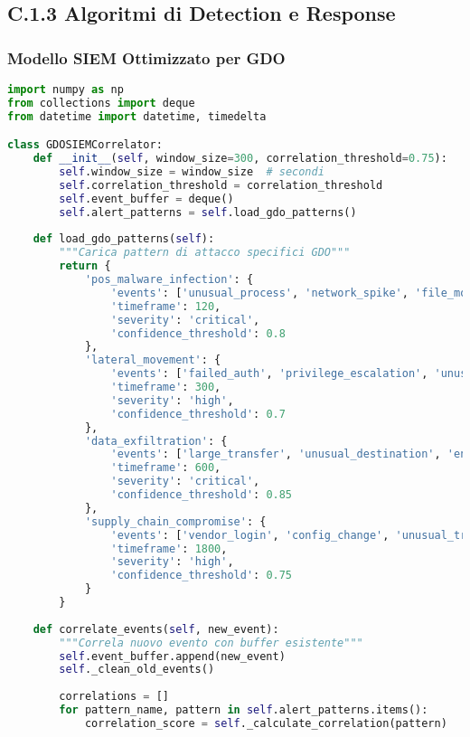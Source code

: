\subsection{\texorpdfstring{\textbf{C.1.3 Algoritmi di Detection e Response}}{C.1.3 - Algoritmi di Detection e Response}}

\subsubsection{Modello SIEM Ottimizzato per GDO}

\begin{lstlisting}[language=Python, caption=Algoritmo di Correlazione Eventi SIEM]
import numpy as np
from collections import deque
from datetime import datetime, timedelta

class GDOSIEMCorrelator:
    def __init__(self, window_size=300, correlation_threshold=0.75):
        self.window_size = window_size  # secondi
        self.correlation_threshold = correlation_threshold
        self.event_buffer = deque()
        self.alert_patterns = self.load_gdo_patterns()
        
    def load_gdo_patterns(self):
        """Carica pattern di attacco specifici GDO"""
        return {
            'pos_malware_infection': {
                'events': ['unusual_process', 'network_spike', 'file_modification'],
                'timeframe': 120,
                'severity': 'critical',
                'confidence_threshold': 0.8
            },
            'lateral_movement': {
                'events': ['failed_auth', 'privilege_escalation', 'unusual_access'],
                'timeframe': 300,
                'severity': 'high',
                'confidence_threshold': 0.7
            },
            'data_exfiltration': {
                'events': ['large_transfer', 'unusual_destination', 'encryption_activity'],
                'timeframe': 600,
                'severity': 'critical',
                'confidence_threshold': 0.85
            },
            'supply_chain_compromise': {
                'events': ['vendor_login', 'config_change', 'unusual_traffic'],
                'timeframe': 1800,
                'severity': 'high',
                'confidence_threshold': 0.75
            }
        }
    
    def correlate_events(self, new_event):
        """Correla nuovo evento con buffer esistente"""
        self.event_buffer.append(new_event)
        self._clean_old_events()
        
        correlations = []
        for pattern_name, pattern in self.alert_patterns.items():
            correlation_score = self._calculate_correlation(pattern)
            

\end{lstlisting}
